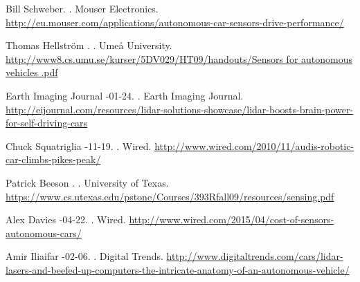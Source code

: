 \documentclass[11pt]{article}
\begin{document}
\begin{thebibliography}{}
Bill Schweber.
.
\newblock Mouser Electronics.
\newblock \href{http://eu.mouser.com/applications/autonomous-car-sensors-drive-performance/}{http://eu.mouser.com/applications/autonomous-car-sensors-drive-performance/}

Thomas Hellstr\"{o}m
.
.
\newblock Ume{\aa} University.
\newblock
\href{http://www8.cs.umu.se/kurser/5DV029/HT09/handouts/Sensors for autonomous vehicles .pdf}{http://www8.cs.umu.se/kurser/5DV029/HT09/handouts/Sensors for autonomous vehicles .pdf}

Earth Imaging Journal
-01-24.
.
\newblock Earth Imaging Journal.
\newblock
\href{http://eijournal.com/resources/lidar-solutions-showcase/lidar-boosts-brain-power-for-self-driving-cars}{http://eijournal.com/resources/lidar-solutions-showcase/lidar-boosts-brain-power-for-self-driving-cars}


Chuck Squatriglia
-11-19.
.
\newblock Wired.
\newblock
\href{http://www.wired.com/2010/11/audis-robotic-car-climbs-pikes-peak/}{http://www.wired.com/2010/11/audis-robotic-car-climbs-pikes-peak/}

Patrick Beeson
.
.
\newblock University of Texas.
\newblock
\href{https://www.cs.utexas.edu/~pstone/Courses/393Rfall09/resources/sensing.pdf}{https://www.cs.utexas.edu/{\texttildelow}pstone/Courses/393Rfall09/resources/sensing.pdf}

Alex Davies
-04-22.
.
\newblock Wired.
\newblock
\href{http://www.wired.com/2015/04/cost-of-sensors-autonomous-cars/}{http://www.wired.com/2015/04/cost-of-sensors-autonomous-cars/}

Amir Iliaifar
-02-06.
.
\newblock Digital Trends.
\newblock
\href{http://www.digitaltrends.com/cars/lidar-lasers-and-beefed-up-computers-the-intricate-anatomy-of-an-autonomous-vehicle/}{http://www.digitaltrends.com/cars/lidar-lasers-and-beefed-up-computers-the-intricate-anatomy-of-an-autonomous-vehicle/}

\end{thebibliography}
\end{document}
